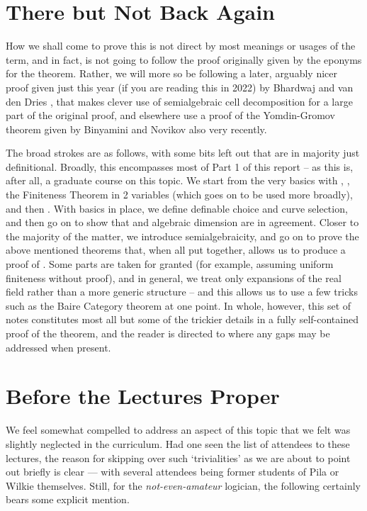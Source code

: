 \section{There but Not Back Again}

How we shall come to prove this is not direct by most meanings or usages of the term, and in fact, is not going to follow the proof originally given by the eponyms for the theorem. Rather, we will more so be following a later, arguably nicer proof given just this year (if you are reading this in 2022) by Bhardwaj and van den Dries \cite{bhardwaj_pilawilkie_2022}, that makes clever use of semialgebraic cell decomposition for a large part of the original proof, and elsewhere use a proof of the Yomdin-Gromov theorem given by Binyamini and Novikov \cite{binyamini_yomdingromov_2021} also very recently.

The broad strokes are as follows, with some bits left out that are in majority just definitional. Broadly, this encompasses most of Part 1 of this report -- as this is, after all, a graduate course on this topic. We start from the very basics with , \omy, the Finiteness Theorem in 2 variables (which goes on to be used more broadly), and then \cds. With basics in place, we define definable choice and curve selection, and then go on to show that  and algebraic dimension are in agreement. Closer to the majority of the matter, we introduce semialgebraicity, and go on to prove the above mentioned theorems that, when all put together, allows us to produce a proof of \pw. Some parts are taken for granted (for example, assuming uniform finiteness without proof), and in general, we treat only expansions of the real field rather than a more generic structure -- and this allows us to use a few tricks such as the Baire Category theorem at one point. In whole, however, this set of notes constitutes most all but some of the trickier details in a fully self-contained proof of the \pw theorem, and the reader is directed to where any gaps may be addressed when present.


\section{Before the Lectures Proper}
We feel somewhat compelled to address an aspect of this topic that we felt was slightly neglected in the curriculum. Had one seen the list of attendees to these lectures, the reason for skipping over such `trivialities' as we are about to point out briefly is clear — with several attendees being former students of Pila or Wilkie themselves. Still, for the \emph{not-even-amateur} logician, the following certainly bears some explicit mention.

